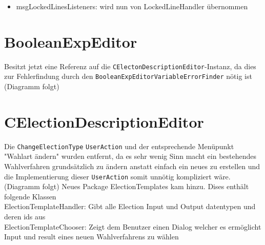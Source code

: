 \documentclass[a4paper]{scrreprt}
\begin{document}
\begin{itemize}
\item msgLockedLinesListeners: wird nun von LockedLineHandler übernommen
\end{itemize}

\section{BooleanExpEditor}
Besitzt jetzt eine Referenz auf die \verb!CElectonDescriptionEditor!-Instanz, da dies zur Fehlerfindung durch den \verb!BooleanExpEditorVariableErrorFinder! nötig ist
\newline
(Diagramm folgt)
\newline

\section{CElectionDescriptionEditor}

Die \verb!ChangeElectionType! \verb!UserAction! und der entsprechende Menüpunkt "Wahlart ändern" wurden entfernt, da es sehr wenig Sinn macht ein bestehendes Wahlverfahren grundsätzlich zu ändern anstatt einfach ein neues zu erstellen und die Implementierung dieser \verb!UserAction! somit unnötig kompliziert wäre.
\newline
(Diagramm folgt)
\newline
Neues Package ElectionTemplates kam hinzu. Dises enthält folgende Klassen\\
ElectionTemplateHandler: Gibt alle Election Input und Output datentypen und deren ids aus\\
ElectionTemplateChooser: Zeigt dem Benutzer einen Dialog welcher es ermöglicht Input und result eines neuen Wahlverfahrens zu wählen
\end{document}
